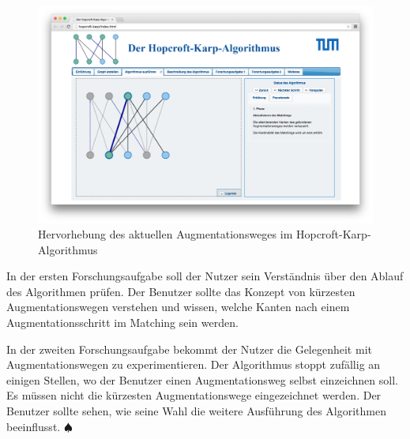 \begin{figure}[h!]
	\centering
	\includegraphics[width=\textwidth]{figures/hopcroft_karp_augmentation}
	\caption[Hopcroft-Karp: Augmentationsweg]{Hervorhebung des aktuellen Augmentationsweges im Hopcroft-Karp-Algorithmus}\label{fig:hopcroft_karp_augmentation}
\end{figure}

In der ersten Forschungsaufgabe soll der Nutzer sein Verständnis über den Ablauf des Algorithmen prüfen. Der Benutzer sollte das Konzept von kürzesten Augmentationswegen verstehen und wissen, welche Kanten nach einem Augmentationsschritt im Matching sein werden.

In der zweiten Forschungsaufgabe bekommt der Nutzer die Gelegenheit mit Augmentationswegen zu experimentieren. Der Algorithmus stoppt zufällig an einigen Stellen, wo der Benutzer einen Augmentationsweg selbst einzeichnen soll. Es müssen nicht die kürzesten Augmentationswege eingezeichnet werden. Der Benutzer sollte sehen, wie seine Wahl die weitere Ausführung des Algorithmen beeinflusst. \hfill$\spadesuit$

